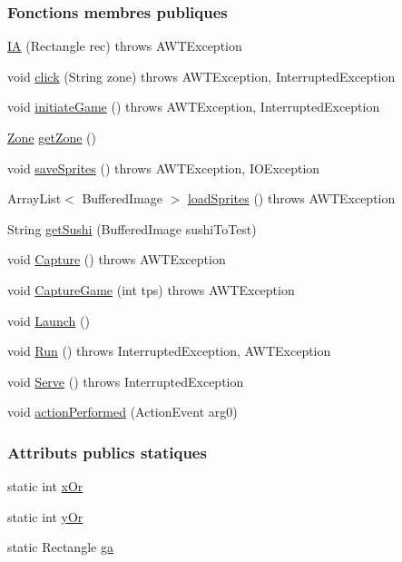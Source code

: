 \subsubsection*{Fonctions membres publiques}
\begin{DoxyCompactItemize}
\item 
\hyperlink{classmain_1_1IA_abdf61311d6f954412d7090bf475ae14b}{I\+A} (Rectangle rec)  throws A\+W\+T\+Exception 
\item 
void \hyperlink{classmain_1_1IA_a12443a6b5c68cfc5ed228cf95497a289}{click} (String zone)  throws A\+W\+T\+Exception, Interrupted\+Exception 
\item 
void \hyperlink{classmain_1_1IA_ae79d50e08efd41c2bc3e2358813d14a0}{initiate\+Game} ()  throws A\+W\+T\+Exception, Interrupted\+Exception 
\item 
\hyperlink{classmain_1_1Zone}{Zone} \hyperlink{classmain_1_1IA_a38da47f9ebf320139219e88999b5592f}{get\+Zone} ()
\item 
void \hyperlink{classmain_1_1IA_a8402495f47d4e31bf6bfa9cf12d07e82}{save\+Sprites} ()  throws A\+W\+T\+Exception, I\+O\+Exception 
\item 
Array\+List$<$ Buffered\+Image $>$ \hyperlink{classmain_1_1IA_a6dcd1dd3cbfe6b00751a004865062b5a}{load\+Sprites} ()  throws A\+W\+T\+Exception 
\item 
String \hyperlink{classmain_1_1IA_afefd04b6129ccdd869e1f077486a133c}{get\+Sushi} (Buffered\+Image sushi\+To\+Test)
\item 
void \hyperlink{classmain_1_1ToolBox_a33e0e8725b840783eb84374703aebcea}{Capture} ()  throws A\+W\+T\+Exception 
\item 
void \hyperlink{classmain_1_1ToolBox_a01fb48e54f183649df1c9e742b966362}{Capture\+Game} (int tps)  throws A\+W\+T\+Exception 
\item 
void \hyperlink{classmain_1_1ToolBox_a93e4314130826a51bf234791e201bebb}{Launch} ()
\item 
void \hyperlink{classmain_1_1ToolBox_a41a6d959beb73dac4a650719737f5c2c}{Run} ()  throws Interrupted\+Exception, A\+W\+T\+Exception 
\item 
void \hyperlink{classmain_1_1ToolBox_a3ab9626ed8eb24317e4fb8906e215c32}{Serve} ()  throws Interrupted\+Exception 
\item 
void \hyperlink{classmain_1_1ToolBox_a6ff2b68cd96e589959f0b66c45696d07}{action\+Performed} (Action\+Event arg0)
\end{DoxyCompactItemize}
\subsubsection*{Attributs publics statiques}
\begin{DoxyCompactItemize}
\item 
static int \hyperlink{classmain_1_1IA_a6c2449fa683b089211b6ca7a8d062b6f}{x\+Or}
\item 
static int \hyperlink{classmain_1_1IA_a7524049aa635b4a3014aeda29b3735af}{y\+Or}
\item 
static Rectangle \hyperlink{classmain_1_1ToolBox_ab1c5162cc4718a5e4b51430dc6ea7d66}{ga}
\end{DoxyCompactItemize}
